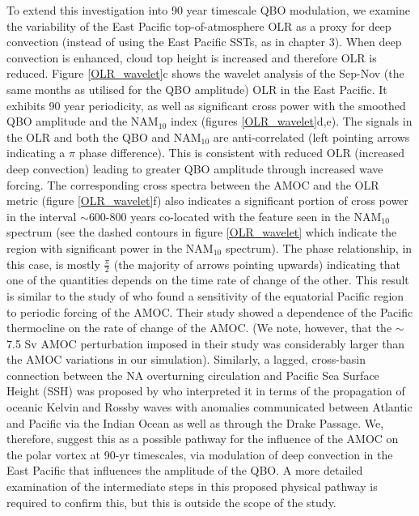 To extend this investigation into 90 year timescale QBO modulation, we examine the variability of the East Pacific top-of-atmosphere OLR as a proxy for deep convection (instead of using the East Pacific SSTs, as in chapter 3). When deep convection is enhanced, cloud top height is increased and therefore OLR is reduced. Figure \ref{OLR_wavelet}c shows the wavelet analysis of the Sep-Nov (the same months as utilised for the QBO amplitude) OLR in the East Pacific. It exhibits 90 year periodicity, as well as significant cross power with the smoothed QBO amplitude and the NAM$_{10}$ index (figures \ref{OLR_wavelet}d,e). The signals in the OLR and both the QBO and NAM$_{10}$ are anti-correlated (left pointing arrows indicating a $\pi$ phase difference). This is consistent with reduced OLR (increased deep convection) leading to greater QBO amplitude through increased wave forcing.  The corresponding cross spectra between the AMOC and the OLR metric (figure \ref{OLR_wavelet}f) also indicates a significant portion of cross power in the interval $\sim$600-800 years co-located with the feature seen in the NAM$_{10}$ spectrum (see the dashed contours in figure \ref{OLR_wavelet} which indicate the region with  significant power in the NAM$_{10}$ spectrum). The phase relationship, in this case, is mostly $\frac{\pi}{2}$ (the majority of arrows pointing upwards) indicating that one of the quantities depends on the time rate of change of the other. This result is similar to the study of \cite{timmermannENSO2005d} who found a sensitivity of the equatorial Pacific region to periodic forcing of the AMOC. Their study showed a dependence of the Pacific thermocline on the rate of change of the AMOC. (We note, however, that the $\sim$7.5 Sv AMOC perturbation imposed in their study was considerably larger than the AMOC variations in our simulation). Similarly, a lagged, cross-basin connection between the NA overturning circulation and Pacific Sea Surface Height (SSH) was proposed by \cite{cessiGlobal2004} who interpreted it in terms of the propagation of oceanic Kelvin and Rossby waves with anomalies communicated between Atlantic and Pacific via the Indian Ocean as well as through the Drake Passage. We, therefore, suggest this as a possible pathway for the influence of the AMOC on the polar vortex at 90-yr timescales, via modulation of deep convection in the East Pacific that influences the amplitude of the QBO. A more detailed examination of the intermediate steps in this proposed physical pathway is required to confirm this, but this is outside the scope of the study.  

